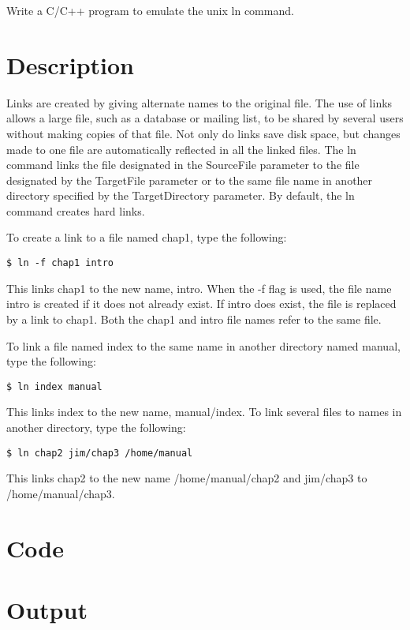 Write a C/C++ program to emulate the unix ln command.

\section{Description}

Links are created by giving alternate names to the original file. The use of links allows a large file, such as a database or mailing list, to be shared by several users without making copies of that file. Not only do links save disk space, but changes made to one file are automatically reflected in all the linked files. The ln command links the file designated in the SourceFile parameter to the file designated by the TargetFile parameter or to the same file name in another directory specified by the TargetDirectory parameter. By default, the ln command creates hard links.


To create a link to a file named chap1, type the following:
\begin{lstlisting}[style=shell-command]
	$ ln -f chap1 intro
\end{lstlisting}

This links chap1 to the new name, intro. When the -f flag is used, the file name intro is created if it does not already exist. If intro does exist, the file is replaced by a link to chap1. Both the chap1 and intro file names refer to the same file.

To link a file named index to the same name in another directory named manual, type the following:
\begin{lstlisting}[style=shell-command]
	$ ln index manual
\end{lstlisting}

This links index to the new name, manual/index. To link several files to names in another directory, type the following:
\begin{lstlisting}[style=shell-command]
	$ ln chap2 jim/chap3 /home/manual
\end{lstlisting}

This links chap2 to the new name /home/manual/chap2 and jim/chap3 to /home/manual/chap3.

\section{Code}



\section{Output}

